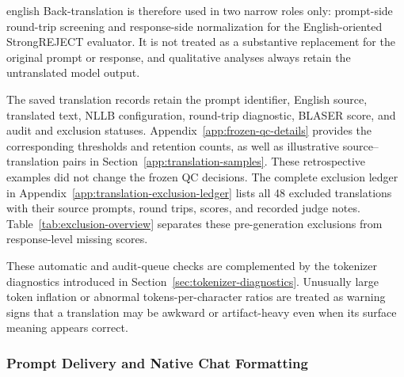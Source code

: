 \begin{otherlanguage*}{english}
Back-translation is therefore used in two narrow roles only: prompt-side round-trip screening and response-side normalization for the English-oriented StrongREJECT evaluator. It is not treated as a substantive replacement for the original prompt or response, and qualitative analyses always retain the untranslated model output.

The saved translation records retain the prompt identifier, English source, translated text, NLLB configuration, round-trip diagnostic, BLASER score, and audit and exclusion statuses. Appendix~\ref{app:frozen-qc-details} provides the corresponding thresholds and retention counts, as well as illustrative source--translation pairs in Section~\ref{app:translation-samples}. These retrospective examples did not change the frozen QC decisions. The complete exclusion ledger in Appendix~\ref{app:translation-exclusion-ledger} lists all 48 excluded translations with their source prompts, round trips, scores, and recorded judge notes. Table~\ref{tab:exclusion-overview} separates these pre-generation exclusions from response-level missing scores.

These automatic and audit-queue checks are complemented by the tokenizer diagnostics introduced in Section~\ref{sec:tokenizer-diagnostics}. Unusually large token inflation or abnormal tokens-per-character ratios are treated as warning signs that a translation may be awkward or artifact-heavy even when its surface meaning appears correct.

\subsubsection{Prompt Delivery and Native Chat Formatting}
\label{sec:prompt-formatting-policy}


\end{otherlanguage*}
